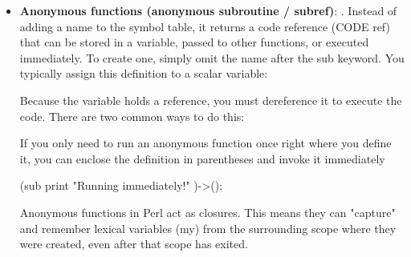 \documentclass{report}
\begin{document}
\begin{itemize}
        \item \textbf{Anonymous functions (anonymous subroutine / subref)}: . Instead of adding a name to the symbol table, it returns a code reference (CODE ref) that can be stored in a variable, passed to other functions, or executed immediately.
            \bigbreak \noindent 
            To create one, simply omit the name after the sub keyword. You typically assign this definition to a scalar variable:
            \bigbreak \noindent 
            \bigbreak \noindent 
            Because the variable holds a reference, you must dereference it to execute the code. There are two common ways to do this:
            \bigbreak \noindent 
            \bigbreak \noindent 
            If you only need to run an anonymous function once right where you define it, you can enclose the definition in parentheses and invoke it immediately
            \bigbreak \noindent 
            \begin{perlcode}
            (sub { print "Running immediately!\n" })->();
            \end{perlcode}
            \bigbreak \noindent 
            Anonymous functions in Perl act as closures. This means they can "capture" and remember lexical variables (my) from the surrounding scope where they were created, even after that scope has exited.
            \bigbreak \noindent 
\end{itemize}
\end{document}
